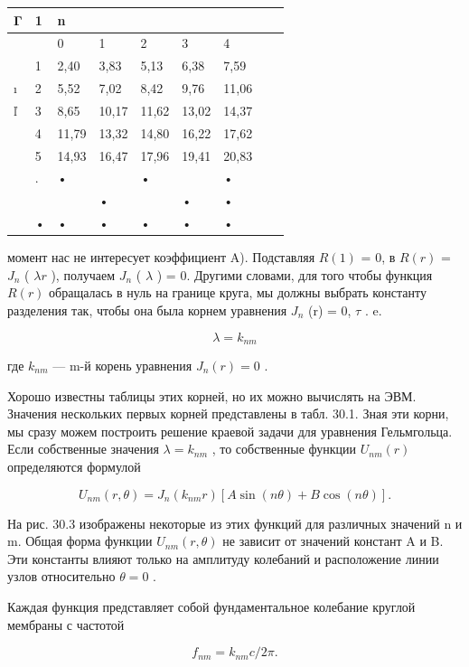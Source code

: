 \documentclass[
  ukrainian,
]{article}
\newcounter{none} %
\begin{document}
{\def\LTcaptype{none} %
\begin{longtable}[]{@{}lllllllll@{}}
\toprule\noalign{}
Γ & 1 & n & & & & & & \\
\midrule\noalign{}
\endhead
\bottomrule\noalign{}
\endlastfoot
& & 0 & 1 & 2 & 3 & 4 & & \\
& 1 & 2,40 & 3,83 & 5,13 & 6,38 & 7,59 & & \\
ı & 2 & 5,52 & 7,02 & 8,42 & 9,76 & 11,06 & & \\
ľ & 3 & 8,65 & 10,17 & 11,62 & 13,02 & 14,37 & & \\
& 4 & 11,79 & 13,32 & 14,80 & 16,22 & 17,62 & & \\
& 5 & 14,93 & 16,47 & 17,96 & 19,41 & 20,83 & & \\
& . & • & & • & & • & & \\
& & & • & & • & • & & \\
& • & • & • & • & • & • & & \\
\end{longtable}
}

момент нас не интересует коэффициент A). Подставляя \(R (1)\) = 0, в
\(R (r)\) = \(J_n\) ( \(\lambda r\) ), получаем \(J_n\) ( \(\lambda\) )
= 0. Другими словами, для того чтобы функция \(R (r)\) обращалась в нуль
на границе круга, мы должны выбрать константу разделения так, чтобы она
была корнем уравнения \(J_n\) (r) = 0, \(\tau\) . e.

\[
\lambda = k_{nm}
\]

где \(k_{nm}\) --- m-й корень уравнения \(J_n(r) = 0\) .

Хорошо известны таблицы этих корней, но их можно вычислять на ЭВМ.
Значения нескольких первых корней представлены в табл. 30.1. Зная эти
корни, мы сразу можем построить решение краевой задачи для уравнения
Гельмгольца. Если собственные значения \(\lambda = k_{nm}\) , то
собственные функции \(U_{nm}(r)\) определяются формулой

\[
U_{nm}(r, \theta) = J_n(k_{nm}r) [A \sin(n\theta) + B \cos(n\theta)].
\]

На рис. 30.3 изображены некоторые из этих функций для различных значений
n и m. Общая форма функции \(U_{nm}(r,\theta)\) не зависит от значений
констант A и B. Эти константы влияют только на амплитуду колебаний и
расположение линии узлов относительно \(\theta=0\) .

Каждая функция представляет собой фундаментальное колебание круглой
мембраны с частотой

\[
f_{nm} = k_{nm}c/2\pi.
\]
\end{document}
